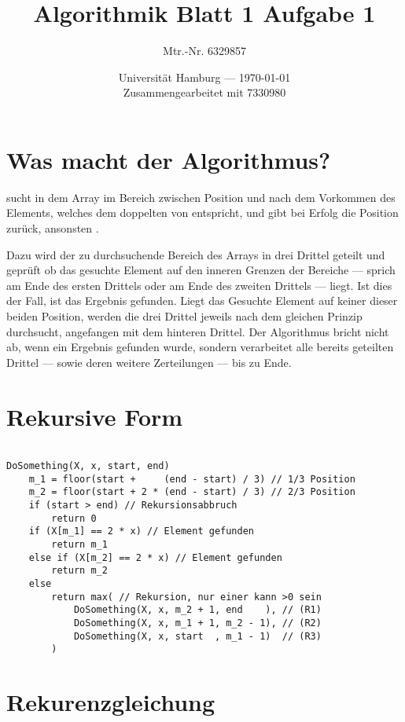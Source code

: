 \documentclass[parskip=half,a4paper]{scrartcl}
\title{Algorithmik Blatt 1 Aufgabe 1} %
\author{Mtr.-Nr. 6329857} %
\date{Universität Hamburg --- \today \\ Zusammengearbeitet mit 7330980} %
\begin{document}
\maketitle %

\section*{Was macht der Algorithmus?}

 sucht in dem Array  im Bereich zwischen Position
 und  nach dem Vorkommen des Elements, welches dem doppelten von 
entspricht, und gibt bei Erfolg die Position zurück, ansonsten .

Dazu wird der zu durchsuchende Bereich des Arrays in drei Drittel geteilt und geprüft ob das gesuchte Element auf den inneren Grenzen der Bereiche --- sprich am Ende des ersten Drittels oder am Ende des zweiten Drittels --- liegt. Ist dies der Fall, ist das Ergebnis gefunden. Liegt das Gesuchte Element auf keiner dieser beiden Position, werden die drei Drittel jeweils nach dem gleichen Prinzip durchsucht, angefangen mit dem hinteren Drittel. Der Algorithmus bricht nicht ab, wenn ein Ergebnis gefunden wurde, sondern verarbeitet alle bereits geteilten Drittel --- sowie deren weitere Zerteilungen --- bis zu Ende.

\section*{Rekursive Form}

\begin{verbatim}

DoSomething(X, x, start, end)
    m_1 = floor(start +     (end - start) / 3) // 1/3 Position
    m_2 = floor(start + 2 * (end - start) / 3) // 2/3 Position
    if (start > end) // Rekursionsabbruch
        return 0
    if (X[m_1] == 2 * x) // Element gefunden
        return m_1
    else if (X[m_2] == 2 * x) // Element gefunden
        return m_2
    else
        return max( // Rekursion, nur einer kann >0 sein
            DoSomething(X, x, m_2 + 1, end    ), // (R1)
            DoSomething(X, x, m_1 + 1, m_2 - 1), // (R2)
            DoSomething(X, x, start  , m_1 - 1)  // (R3)
        )

\end{verbatim}

\section*{Rekurenzgleichung}
\end{document}
